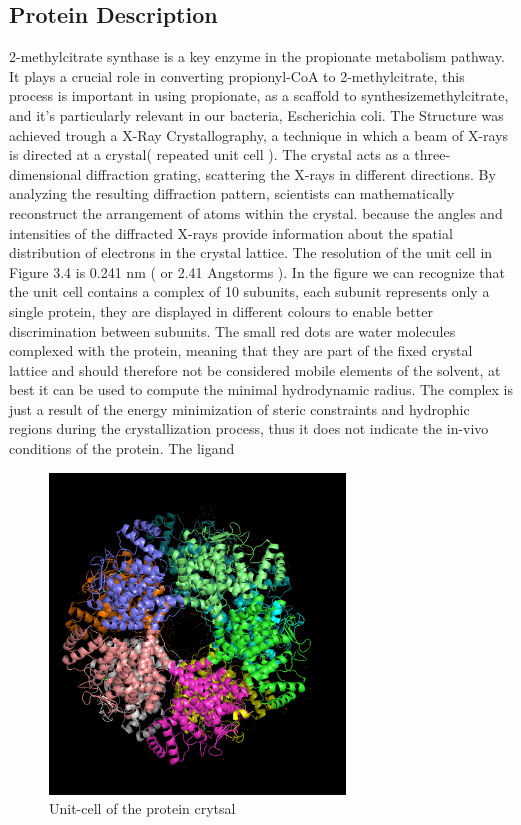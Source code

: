 \documentclass[a4paper,english,12pt,bibliography=totoc]{scrreprt}
\begin{document}
\subsection{Protein Description}
2-methylcitrate synthase is a  key enzyme in the propionate metabolism pathway. It plays a crucial role in converting propionyl-CoA to 2-methylcitrate, this process is important in using propionate, as a scaffold to synthesizemethylcitrate, and it's particularly relevant in our bacteria, Escherichia coli.
The Structure was achieved trough a X-Ray Crystallography, a technique in which a beam of X-rays is directed at a crystal( repeated unit cell ). The crystal acts as a three-dimensional diffraction grating, scattering the X-rays in different directions. By analyzing the resulting diffraction pattern, scientists can mathematically reconstruct the arrangement of atoms within the crystal. because the angles and intensities of the diffracted X-rays provide information about the spatial distribution of electrons in the crystal lattice.
The resolution of the unit cell in Figure 3.4 is 0.241 nm ( or 2.41 Angstorms ).
In the figure we can recognize that the unit cell contains a complex of 10 subunits, each subunit represents only a single protein, they are displayed in different colours to enable better discrimination between subunits.
The small red dots are water molecules complexed with the protein, meaning that they are part of the fixed crystal lattice and should therefore not be considered mobile elements of the solvent, at best it can be used to compute the minimal hydrodynamic radius.
The complex is just a result of the energy minimization of steric constraints and hydrophic regions during the crystallization process, thus it does not indicate the in-vivo conditions of the protein.
The ligand
\begin{figure}[H]
        \centering
        \includegraphics[width=0.7\textwidth]{Project 3/Repeating Cell X-ray Crystal.png}
	    \caption{Unit-cell of the protein crytsal}
\end{figure}
\end{document}
